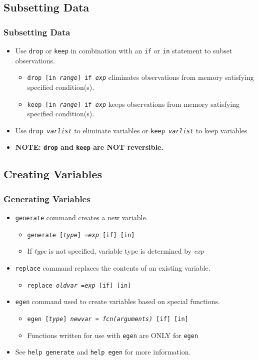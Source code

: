 \documentclass{beamer}
\begin{document}
\subsection{Subsetting Data}

\begin{frame}
	\frametitle{Subsetting Data}
		\begin{itemize}
			\item Use \texttt{drop} or \texttt{keep} in combination with an \texttt{if} or \texttt{in} statement to subset observations.
				\begin{itemize}
					\item \texttt{drop [in \textit{range}] if \textit{exp}} eliminates observations from memory satisfying specified condition(s).
					\item \texttt{keep [in \textit{range}] if \textit{exp}} keeps observations from memory satisfying specified condition(s).
				\end{itemize}
			\item Use \texttt{drop \textit{varlist}} to eliminate variables or \texttt{keep \textit{varlist}} to keep variables
			\item \textbf{NOTE: \texttt{drop} and \texttt{keep} are NOT reversible.}
		\end{itemize}
\end{frame}

\subsection{Creating Variables}

\begin{frame}
	\frametitle{Generating Variables}
		\begin{itemize}
			\item \texttt{\underline{g}enerate} command creates a new variable.
				\begin{itemize}
					\item \texttt{generate [\textit{type}] =\textit{exp} [if] [in]}
					\item If \textit{type} is not specified, variable type is determined by \textit{exp}
				\end{itemize}
			\item \texttt{replace} command replaces the contents of an existing variable.
				\begin{itemize}
					\item \texttt{replace \textit{oldvar} =\textit{exp} [if] [in]}
				\end{itemize}
			\item \texttt{egen} command used to create variables based on special functions.
				\begin{itemize}
					\item \texttt{egen [\textit{type}] \textit{newvar} = \textit{fcn(arguments)} [if] [in]}
					\item Functions written for use with \texttt{egen} are ONLY for \texttt{egen}
				\end{itemize}
			\item See \texttt{help generate} and \texttt{help egen} for more information.
		\end{itemize}
\end{frame}
\end{document}
